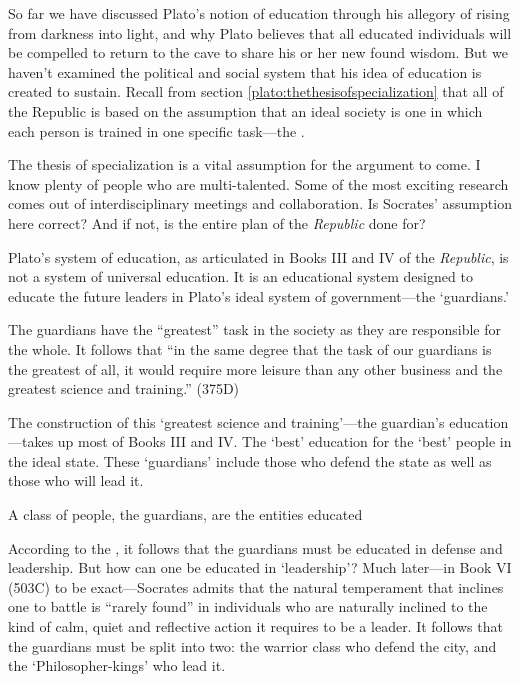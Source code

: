 So far we have discussed Plato's notion of education through his allegory of rising from darkness into light, and why Plato believes that all educated individuals will be compelled to return to the cave to share his or her new found wisdom. But we haven't examined the political and social system that his idea of education is created to sustain. Recall from section \ref{plato:thethesisofspecialization} that all of the Republic is based on the assumption that an ideal society is one in which each person is trained in one specific task---the .\begin{question}The thesis of specialization is a vital assumption for the argument to come. I know plenty of people who are multi-talented. Some of the most exciting research comes out of interdisciplinary meetings and collaboration. Is Socrates' assumption here correct? And if not, is the entire plan of the \emph{Republic} done for?\end{question}

Plato's system of education, as articulated in Books III and IV of the \emph{Republic}, is not a system of universal education. It is an educational system designed to educate the future leaders in Plato's ideal system of government---the `guardians.' 

The guardians have the ``greatest'' task in the society as they are responsible for the whole. It follows that ``in the same degree that the task of our guardians is the greatest of all, it would require more leisure than any other business and the greatest science and training.'' (375D) 

The construction of this `greatest science and training'---the guardian's education---takes up most of Books III and IV. The `best' education for the `best' people in the ideal state. These `guardians' include those who defend the state as well as those who will lead it. 
\begin{entities}\label{platoentities}
A class of people, the guardians, are the entities educated
\end{entities} 

According to the , it follows that the guardians must be educated in defense and leadership. But how can one be educated in `leadership'? Much later---in Book VI (503C) to be exact---Socrates admits that the natural temperament that inclines one to battle is ``rarely found'' in individuals who are naturally inclined to the kind of calm, quiet and reflective action it requires to be a leader. It follows that the guardians must be split into two: the warrior class who defend the city, and the `Philosopher-kings' who lead it.

